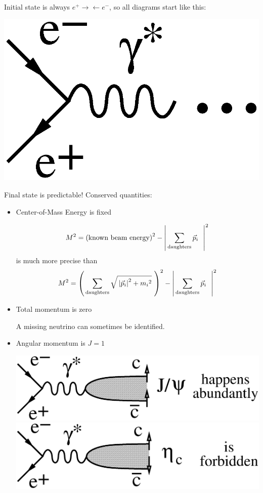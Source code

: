 
\begin{slide*}
\slideframe{}
\begin{minipage}[t]{\linewidth}
\huge

\vspace{0.1 cm}

Initial state is always $e^+ \rightarrow \leftarrow e^-$, so
all diagrams start like this:
\begin{center}
  \vspace{-1 cm}
  \includegraphics[height=2 cm]{diagram_start.eps}
\end{center}

\vspace{-0.3 cm}
Final state is predictable!  Conserved quantities:
\begin{itemize}

  \item Center-of-Mass Energy is fixed \\
  \begin{minipage}{\linewidth}
    \LARGE
    \[ M^2 = \left(\mbox{known beam energy}\right)^2
       - \left| \, \sum_{\mbox{\scriptsize daughters}} \vec{p}_i \ \ \right|^2 \vspace{-0.4 cm} \]
    is much more precise than \vspace{-0.2 cm}
    \[ M^2 = \left(\, \sum_{\mbox{\scriptsize daughters}} \sqrt{\, \left|\vec{p}_i\right|^2 + \mbox{$m_i$}^2} \ \right)^2
       - \left| \, \sum_{\mbox{\scriptsize daughters}} \vec{p}_i \ \ \right|^2 \]
  \end{minipage}

  \item Total momentum is zero \\
  \begin{minipage}{\linewidth}
    \LARGE
    A missing neutrino can sometimes be identified.
  \end{minipage}

  \item Angular momentum is $J=1$
  \begin{center}
    \includegraphics[width=0.45\linewidth]{diagram_jpsi.eps} \hspace{0.2 cm}
    \includegraphics[width=0.45\linewidth]{diagram_etac.eps}
  \end{center}


\end{itemize}
\end{minipage}
\end{slide*}
